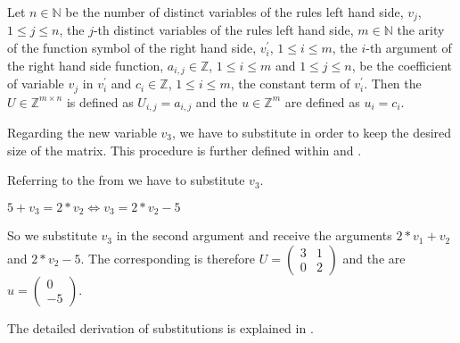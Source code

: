 \begin{definition}
	\label{def:update}
	Let $n \in \mathbb{N}$ be the number of distinct variables of the \loopt rules left hand side, $v_j$, $1 \le j \le n$, the $j$-th distinct	variables of the \loopt rules left hand side, $m \in \mathbb{N}$ the arity of the function symbol of the right hand side, $v^\prime_i$, $1 \le i \le m$, the $i$-th argument of the right hand side function, $a_{i,j} \in \mathbb{Z}$, $1 \le i \le m$ and $1 \le j \le n$, be the coefficient of variable $v_j$ in $v^\prime_i$ and $c_i \in \mathbb{Z}$, $1 \le i \le m$, the constant term of $v^\prime_i$. \newline
	Then the \updatematrix $U \in \mathbb{Z}^{m \times n}$ is defined as $U_{i,j}=a_{i,j}$ and the \updateconstants $u \in \mathbb{Z}^m$ are defined as $u_i = c_i$.
\end{definition}
Regarding the new variable $v_3$, we have to substitute in order to keep the desired size of the matrix. This procedure is further defined within  and .

\begin{example}
	\label{ex:updatematrix-and-constants}
	Referring to the \its from  we have to substitute $v_3$.
	\begin{center}
		$5+v_3=2*v_2 \Leftrightarrow v_3=2*v_2-5$
	\end{center}
	So we substitute $v_3$ in the second argument and receive the arguments $2*v_1+v_2$ and $2*v_2-5$.
	The corresponding \updatematrix is therefore $U = \begin{pmatrix} 3 & 1 \\ 0 & 2 \end{pmatrix}$ and the \updateconstants are $u = \begin{pmatrix} 0 \\ -5 \end{pmatrix}$.
	
	The detailed derivation of substitutions is explained in .
\end{example}

